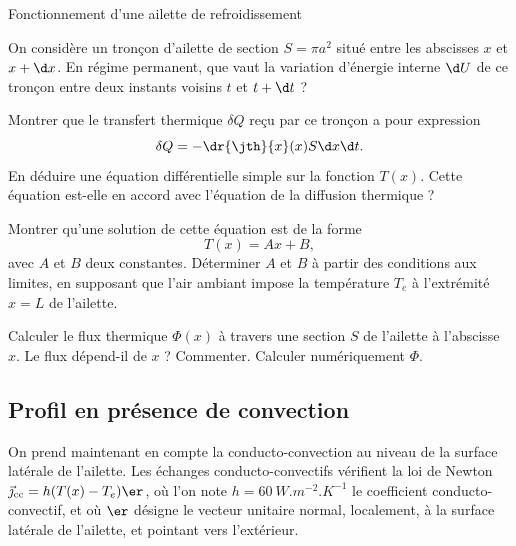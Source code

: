 \begin{exo}[PC][1][devoir]{Fonctionnement d'une ailette de refroidissement}
\begin{quest}
\item On considère un tronçon d'ailette de section $S=\pi a^2$ situé entre les abscisses $x$ et $x + \d x$.
En régime permanent, que vaut la variation d'énergie interne $\d U$ de ce tronçon entre deux instants voisins $t$ et $t + \d t$ ?
\item Montrer que le transfert thermique $\delta Q$ reçu par ce tronçon a pour expression
$$
\delta Q = - \dr{\jth}{x}(x) S \d x \d t.
$$
En déduire une équation différentielle simple sur la fonction $T(x)$. Cette équation est-elle en accord avec l'équation de la diffusion thermique ?
\item Montrer qu'une solution de cette équation est de la forme
$$
  T(x) = A x + B,
$$
avec $A$ et $B$ deux constantes. Déterminer $A$ et $B$ à partir des conditions aux limites, en supposant que l'air ambiant impose la température $T_e$ à l'extrémité $x=L$ de l'ailette.
\item Calculer le flux thermique $\Phi(x)$ à travers une section $S$ de l'ailette à l'abscisse $x$. Le flux dépend-il de $x$ ? Commenter. Calculer numériquement $\Phi$.
\end{quest}

\subsection{Profil en présence de convection}
On prend maintenant en compte la conducto-convection au niveau de la surface latérale de l'ailette.
Les échanges conducto-convectifs vérifient la loi de Newton $\Vec{\jmath}_{\rm cc} = h(T(x)-T_e)\er$, où l'on note $h=\SI{60}{W.m^{-2}.K^{-1}}$ le coefficient conducto-convectif,
et où $\er$ désigne le vecteur unitaire normal, localement, à la surface latérale de l'ailette, et pointant vers l'extérieur.


\end{exo}
